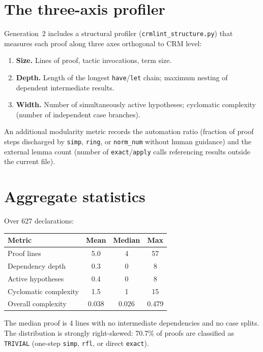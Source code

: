 \documentclass[11pt,a4paper]{article}
\theoremstyle{plain}
\theoremstyle{definition}
\begin{document}
\section{The three-axis profiler}\label{sec:three-axis}

Generation~2 includes a structural profiler (\texttt{crmlint\_structure.py})
that measures each proof along three axes orthogonal to CRM level:

\begin{enumerate}[label=\textbf{Axis \arabic*:}]
\item \textbf{Size.} Lines of proof, tactic invocations, term size.
\item \textbf{Depth.} Length of the longest \texttt{have}/\texttt{let}
  chain; maximum nesting of dependent intermediate results.
\item \textbf{Width.} Number of simultaneously active hypotheses;
  cyclomatic complexity (number of independent case branches).
\end{enumerate}

An additional modularity metric records the automation ratio (fraction
of proof steps discharged by \texttt{simp}, \texttt{ring}, or
\texttt{norm\_num} without human guidance) and the external lemma
count (number of \texttt{exact}/\texttt{apply} calls referencing
results outside the current file).

\section{Aggregate statistics}\label{sec:aggregate-stats}

Over 627 declarations:

\begin{center}
\begin{tabular}{lccc}
\toprule
\textbf{Metric} & \textbf{Mean} & \textbf{Median} & \textbf{Max} \\
\midrule
Proof lines          &  5.0 &  4 & 57 \\
Dependency depth     &  0.3 &  0 &  8 \\
Active hypotheses    &  0.4 &  0 &  8 \\
Cyclomatic complexity & 1.5 &  1 & 15 \\
Overall complexity   & 0.038 & 0.026 & 0.479 \\
\bottomrule
\end{tabular}
\end{center}

The median proof is 4 lines with no intermediate dependencies and no
case splits.  The distribution is strongly right-skewed: 70.7\% of
proofs are classified as \texttt{TRIVIAL} (one-step \texttt{simp},
\texttt{rfl}, or direct \texttt{exact}).
\end{document}
